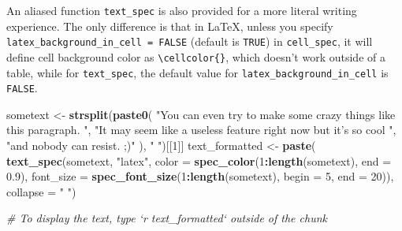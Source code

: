 \documentclass[table]{article}
\newenvironment{Shaded}{\begin{snugshade}}{\end{snugshade}}
\newcommand{\CommentTok}[1]{\textcolor[rgb]{0.56,0.35,0.01}{\textit{#1}}}
\newcommand{\DataTypeTok}[1]{\textcolor[rgb]{0.13,0.29,0.53}{#1}}
\newcommand{\DecValTok}[1]{\textcolor[rgb]{0.00,0.00,0.81}{#1}}
\newcommand{\FloatTok}[1]{\textcolor[rgb]{0.00,0.00,0.81}{#1}}
\newcommand{\KeywordTok}[1]{\textcolor[rgb]{0.13,0.29,0.53}{\textbf{#1}}}
\newcommand{\NormalTok}[1]{#1}
\newcommand{\OperatorTok}[1]{\textcolor[rgb]{0.81,0.36,0.00}{\textbf{#1}}}
\newcommand{\StringTok}[1]{\textcolor[rgb]{0.31,0.60,0.02}{#1}}
\begin{document}
An aliased function \texttt{text\_spec} is also provided for a more
literal writing experience. The only difference is that in LaTeX, unless
you specify \texttt{latex\_background\_in\_cell\ =\ FALSE} (default is
\texttt{TRUE}) in \texttt{cell\_spec}, it will define cell background
color as \texttt{\textbackslash{}cellcolor\{\}}, which doesn't work
outside of a table, while for \texttt{text\_spec}, the default value for
\texttt{latex\_background\_in\_cell} is \texttt{FALSE}.

\begin{Shaded}
\begin{Highlighting}[]
\NormalTok{sometext <-}\StringTok{ }\KeywordTok{strsplit}\NormalTok{(}\KeywordTok{paste0}\NormalTok{(}
  \StringTok{"You can even try to make some crazy things like this paragraph. "}\NormalTok{, }
  \StringTok{"It may seem like a useless feature right now but it's so cool "}\NormalTok{,}
  \StringTok{"and nobody can resist. ;)"}
\NormalTok{), }\StringTok{" "}\NormalTok{)[[}\DecValTok{1}\NormalTok{]]}
\NormalTok{text_formatted <-}\StringTok{ }\KeywordTok{paste}\NormalTok{(}
  \KeywordTok{text_spec}\NormalTok{(sometext, }\StringTok{"latex"}\NormalTok{, }\DataTypeTok{color =} \KeywordTok{spec_color}\NormalTok{(}\DecValTok{1}\OperatorTok{:}\KeywordTok{length}\NormalTok{(sometext), }\DataTypeTok{end =} \FloatTok{0.9}\NormalTok{),}
            \DataTypeTok{font_size =} \KeywordTok{spec_font_size}\NormalTok{(}\DecValTok{1}\OperatorTok{:}\KeywordTok{length}\NormalTok{(sometext), }\DataTypeTok{begin =} \DecValTok{5}\NormalTok{, }\DataTypeTok{end =} \DecValTok{20}\NormalTok{)),}
  \DataTypeTok{collapse =} \StringTok{" "}\NormalTok{)}

\CommentTok{# To display the text, type `r text_formatted` outside of the chunk}
\end{Highlighting}
\end{Shaded}
\end{document}
